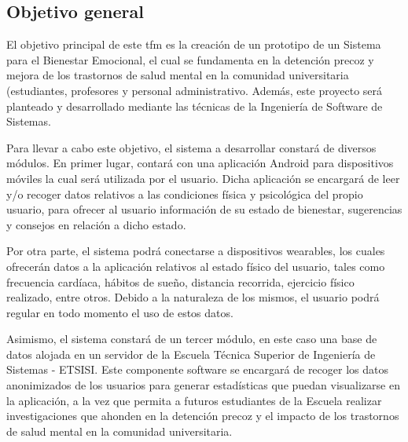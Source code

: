     \subsection{Objetivo general}

        El objetivo principal de este \gls{tfm} es la creación de un prototipo de un Sistema para el Bienestar Emocional, el cual se fundamenta en la detención precoz y mejora de los trastornos de salud mental en la comunidad universitaria (estudiantes, profesores y personal administrativo.  Además, este proyecto será planteado y desarrollado mediante las técnicas de la Ingeniería de Software de Sistemas.
    
        Para llevar a cabo este objetivo, el sistema a desarrollar constará de diversos módulos. En primer lugar, contará con una aplicación Android para dispositivos móviles la cual será utilizada por el usuario. Dicha aplicación se encargará de leer y/o recoger datos relativos a las condiciones física y psicológica del propio usuario, para ofrecer al usuario información de su estado de bienestar, sugerencias y consejos en relación a dicho estado.
    
        Por otra parte, el sistema podrá conectarse a dispositivos \glspl{wearable}, los cuales ofrecerán datos a la aplicación relativos al estado físico del usuario, tales como frecuencia cardíaca, hábitos de sueño, distancia recorrida, ejercicio físico realizado, entre otros. 
        Debido a la naturaleza de los mismos, el usuario podrá regular en todo momento el uso de estos datos.
    
        Asimismo, el sistema constará de un tercer módulo, en este caso una base de datos alojada en un servidor de la Escuela Técnica Superior de Ingeniería de Sistemas - ETSISI. Este componente software se encargará de recoger los datos anonimizados de los usuarios para generar estadísticas que puedan visualizarse en la aplicación, a la vez que permita a futuros estudiantes de la Escuela realizar investigaciones que ahonden en la detención precoz y el impacto de los trastornos de salud mental en la comunidad universitaria.

